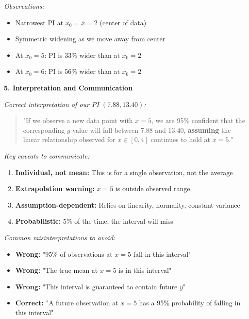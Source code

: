 \documentclass[12pt]{article}
\begin{document}
\begin{explanation}
\textit{Observations:}
\begin{itemize}
    \item Narrowest PI at $x_0 = \bar{x} = 2$ (center of data)
    \item Symmetric widening as we move away from center
    \item At $x_0 = 5$: PI is 33\% wider than at $x_0 = 2$
    \item At $x_0 = 6$: PI is 56\% wider than at $x_0 = 2$
\end{itemize}

\textbf{5. Interpretation and Communication}

\textit{Correct interpretation of our PI $(7.88, 13.40)$:}

\begin{quote}
"If we observe a new data point with $x = 5$, we are 95\% confident that the corresponding $y$ value will fall between 7.88 and 13.40, \textbf{assuming} the linear relationship observed for $x \in [0, 4]$ continues to hold at $x = 5$."
\end{quote}

\textit{Key caveats to communicate:}

\begin{enumerate}
    \item \textbf{Individual, not mean:} This is for a single observation, not the average
    \item \textbf{Extrapolation warning:} $x = 5$ is outside observed range
    \item \textbf{Assumption-dependent:} Relies on linearity, normality, constant variance
    \item \textbf{Probabilistic:} 5\% of the time, the interval will miss
\end{enumerate}

\textit{Common misinterpretations to avoid:}

\begin{itemize}
    \item \textbf{Wrong:} "95\% of observations at $x = 5$ fall in this interval"
    \item \textbf{Wrong:} "The true mean at $x = 5$ is in this interval"
    \item \textbf{Wrong:} "This interval is guaranteed to contain future $y$"
    \item \textbf{Correct:} "A future observation at $x = 5$ has a 95\% probability of falling in this interval"
\end{itemize}


\end{explanation}
\end{document}
